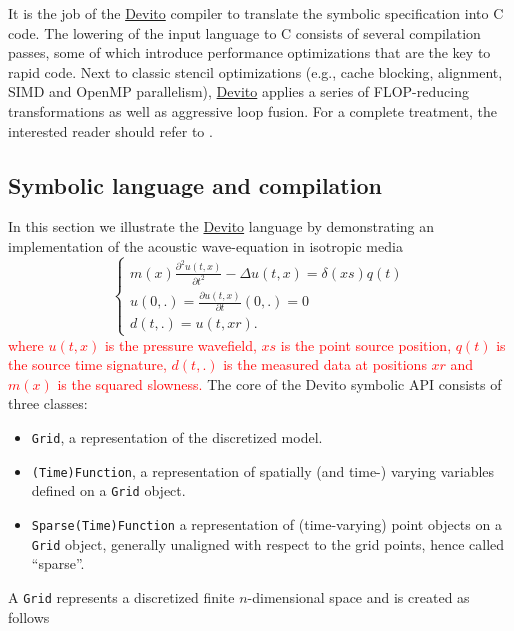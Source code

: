 \documentclass[10pt, conference]{IEEEtran}
\newcommand{\devito}{\href{https://github.com/devitocodes/devito}{Devito} }
\begin{document}
It is the job of the \devito compiler to translate the symbolic specification
into C code. The lowering of the input language to C consists of
several compilation passes, some of which introduce performance
optimizations that are the key to rapid code. Next to classic stencil
optimizations (e.g., cache blocking, alignment, SIMD and OpenMP
parallelism), \devito applies a series of FLOP-reducing transformations as
well as aggressive loop fusion. For a complete treatment, the interested
reader should refer to \cite{devito-compiler}.

\subsection{Symbolic language and
compilation}\label{symbolic-language-and-compilation}

In this section we illustrate the \devito language by demonstrating
an implementation of the acoustic wave-equation in isotropic media
%
\begin{equation}
\begin{cases}
 m(x) \frac{\partial^2 u(t, x)}{\partial t^2} - \Delta u(t, x) = \delta(xs) q(t) \\
 u(0, .) = \frac{\partial u(t, x)}{\partial t}(0, .) = 0 \\
 d(t, .) = u(t, xr).
 \end{cases}
\label{acou}
\end{equation}
%
\textcolor{red}{where $u(t, x)$ is the pressure wavefield, $xs$ is the point source position, 
$q(t)$ is the source time signature, $d(t, .)$ is the measured data at positions $xr$ and $m(x)$ is the
squared slowness.}
 The core of the Devito
symbolic API consists of three classes:

\begin{itemize}
\itemsep1pt\parskip0pt
\item
  \texttt{Grid}, a representation of the discretized model.
\item
  \texttt{(Time)Function}, a representation of spatially (and time-)
  varying variables defined on a \texttt{Grid} object.
\item
  \texttt{Sparse(Time)Function} a representation of (time-varying) point
  objects on a \texttt{Grid} object, generally unaligned with respect to
  the grid points, hence called ``sparse''.
\end{itemize}

A \texttt{Grid} represents a discretized finite $n$-dimensional space and
is created as follows
\end{document}
